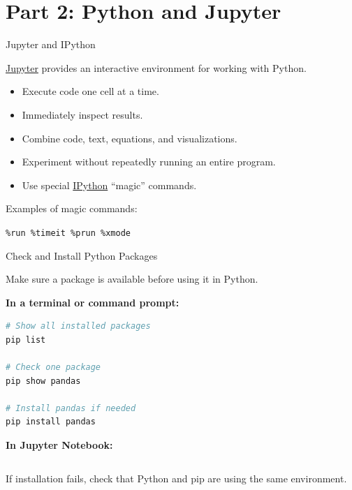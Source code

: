 \documentclass[aspectratio=43,10pt]{beamer}
\begin{document}
\section{Part 2: Python and Jupyter}

\begin{frame}{Jupyter and IPython}

\href{https://jupyter.org}{Jupyter} provides an interactive environment for working with Python.

\begin{itemize}
  \item Execute code one cell at a time.
  \item Immediately inspect results.
  \item Combine code, text, equations, and visualizations.
  \item Experiment without repeatedly running an entire program.
  \item Use special \href{https://ipython.org}{IPython} ``magic'' commands.
\end{itemize}

\vspace{0.3cm}

Examples of magic commands:

\begin{center}
  \texttt{\%run \qquad \%timeit \qquad \%prun \qquad \%xmode}
\end{center}

\end{frame}

\begin{frame}[fragile]{Check and Install Python Packages}

Make sure a package is available before using it in Python.

\vspace{0.4em}

\textbf{In a terminal or command prompt:}

\begin{lstlisting}[language=bash]
# Show all installed packages
pip list

# Check one package
pip show pandas

# Install pandas if needed
pip install pandas
\end{lstlisting}

\vspace{0.3em}

\textbf{In Jupyter Notebook:}

\begin{lstlisting}[language=Python]
%pip install pandas
\end{lstlisting}

\vspace{0.3em}

If installation fails, check that Python and pip are using the same environment.

\end{frame}
\end{document}
